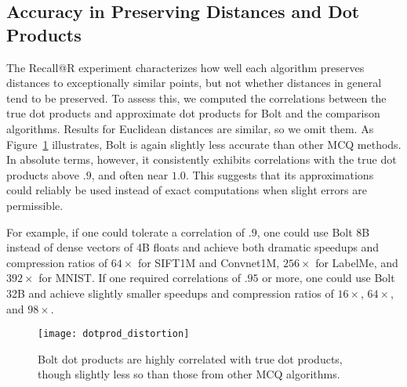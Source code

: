 

\subsection{Accuracy in Preserving Distances and Dot Products}

The Recall@R experiment characterizes how well each algorithm preserves distances to exceptionally similar points, but not whether distances in general tend to be preserved. To assess this, we computed the correlations between the true dot products and approximate dot products for Bolt and the comparison algorithms. Results for Euclidean distances are similar, so we omit them. As Figure~\ref{fig:dotprod_distortion} illustrates, Bolt is again slightly less accurate than other MCQ methods. In absolute terms, however, it consistently exhibits correlations with the true dot products above $.9$, and often near $1.0$. This suggests that its approximations could reliably be used instead of exact computations when slight errors are permissible.

For example, if one could tolerate a correlation of $.9$, one could use Bolt 8B instead of dense vectors of 4B floats and achieve both dramatic speedups and compression ratios of $64\times$ for SIFT1M and Convnet1M, $256\times$ for LabelMe, and $392\times$ for MNIST. If one required correlations of $.95$ or more, one could use Bolt 32B and achieve slightly smaller speedups and compression ratios of $16\times$, $64\times$, and $98\times$.

\begin{figure}[h]
\begin{center}
\label{fig:dotprod_distortion}
\texttt{[image: dotprod\_distortion]}
\caption{Bolt dot products are highly correlated with true dot products, though slightly less so than those from other MCQ algorithms.}
\end{center}
\end{figure}

